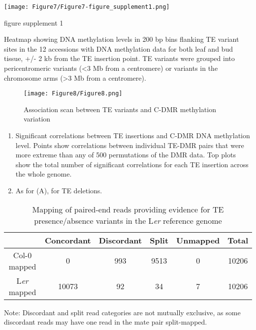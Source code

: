 \documentclass[12pt]{article}
\begin{document}
\pagebreak


\setcounter{suppfigure}{6}

\begin{suppfigure}
  \centering
  \texttt{[image: Figure7/Figure7-figure\_supplement1.png]}
  \caption{figure supplement 1}
  \label{fig7s1}
\end{suppfigure}

Heatmap showing DNA methylation levels in 200 bp bins flanking TE
variant sites in the 12 accessions with DNA methylation data for both
leaf and bud tissue, +/- 2 kb from the TE insertion point. TE variants
were grouped into pericentromeric variants (\textless{}3 Mb from a
centromere) or variants in the chromosome arms (\textgreater{}3 Mb from
a centromere).

\pagebreak


\begin{figure}[!ht]
  \centering
  \texttt{[image: Figure8/Figure8.png]}
  \caption{Association scan between TE variants and C-DMR methylation variation}
  \label{fig8}
\end{figure}

\begin{enumerate}
  \def\labelenumi{(\Alph{enumi})}
\item
  Significant correlations between TE insertions and C-DMR DNA
  methylation level. Points show correlations between individual TE-DMR
  pairs that were more extreme than any of 500 permutations of the DMR
  data. Top plots show the total number of significant correlations for
  each TE insertion across the whole genome.
\item
  As for (A), for TE deletions.
\end{enumerate}

\pagebreak

\begin{table}[h]
  \centering
  \begin{threeparttable}
    \caption{Mapping of paired-end reads providing evidence for TE presence/absence
      variants in the L\emph{er} reference genome}
    \label{table1}
    \begin{tabular}{@{}cccccc@{}}
      \toprule
      \textbf{}  & \textbf{Concordant} & \textbf{Discordant} & \textbf{Split} & \textbf{Unmapped} & \textbf{Total} \\ \midrule
      Col-0 mapped & 0 & 993 & 9513 & 0 & 10206 \\
      L\emph{er} mapped & 10073 & 92 & 34 & 7 & 10206 \\ \bottomrule
    \end{tabular}
    \begin{tablenotes}
      \small
    \item Note: Discordant and split read categories are not mutually exclusive, as some discordant reads may have one read in the mate pair split-mapped.
    \end{tablenotes}
  \end{threeparttable}
\end{table}
\end{document}
